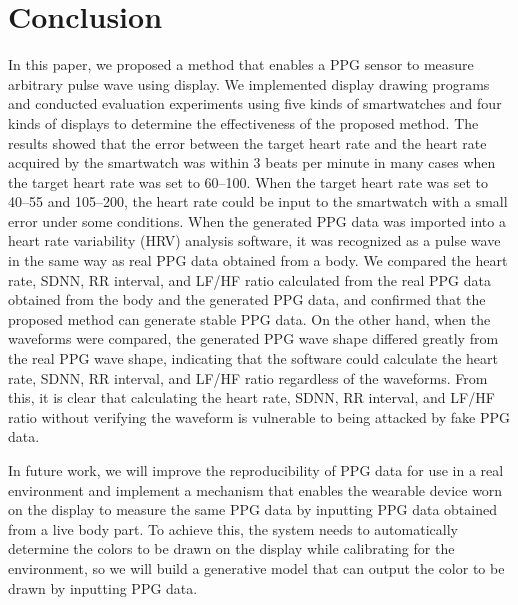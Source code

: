 \documentclass[sigchi,authordraft]{acmart}
\begin{document}
\section{Conclusion}
\label{sec:conclusion}
In this paper, we proposed a method that enables a PPG sensor to measure arbitrary pulse wave using display. We implemented display drawing programs and conducted evaluation experiments using five kinds of smartwatches and four kinds of displays to determine the effectiveness of the proposed method. The results showed that the error between the target heart rate and the heart rate acquired by the smartwatch was within $3$ beats per minute in many cases when the target heart rate was set to 60--100. When the target heart rate was set to 40--55 and 105--200, the heart rate could be input to the smartwatch with a small error under some conditions. When the generated PPG data was imported into a heart rate variability (HRV) analysis software, it was recognized as a pulse wave in the same way as real PPG data obtained from a body. We compared the heart rate, SDNN, RR interval, and LF/HF ratio calculated from the real PPG data obtained from the body and the generated PPG data, and confirmed that the proposed method can generate stable PPG data. On the other hand, when the waveforms were compared, the generated PPG wave shape differed greatly from the real PPG wave shape, indicating that the software could calculate the heart rate, SDNN, RR interval, and LF/HF ratio regardless of the waveforms. From this, it is clear that calculating the heart rate, SDNN, RR interval, and LF/HF ratio without verifying the waveform is vulnerable to being attacked by fake PPG data.\par

In future work, we will improve the reproducibility of PPG data for use in a real environment and implement a mechanism that enables the wearable device worn on the display to measure the same PPG data by inputting PPG data obtained from a live body part. To achieve this, the system needs to automatically determine the colors to be drawn on the display while calibrating for the environment, so we will build a generative model that can output the color to be drawn by inputting PPG data.




\end{document}
